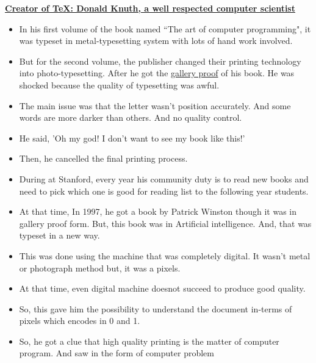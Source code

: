 \documentclass{article}
\begin{document}
\noindent \underline{\bfseries Creator of \TeX: Donald Knuth, a well respected computer scientist}

\begin{itemize}


\item In his first volume of the book named \textquotedblleft The art of computer programming", it was typeset in 
metal-typesetting system with lots of hand work involved. 


\item But for the second volume, the publisher changed their printing technology into photo-typesetting. After he
got the \href{https://en.wikipedia.org/wiki/Galley_proof}{gallery proof} of his book. He was shocked because the quality of typesetting was awful.


\item The main issue was that the letter wasn't position accurately. And some words are more darker than others. And no quality control.


\item He said, 'Oh my god! I don't want to see my book like this!'


\item Then, he cancelled the final printing process.


\item During at Stanford, every year his community duty is to read new books and need to pick
which one is good for reading list to the following year students.


\item At that time, In 1997, he got a book by Patrick Winston though it was in gallery proof form. But, this book was in Artificial intelligence. And, that was typeset in a new way. 

\item This was done using the machine that was completely digital. It wasn't metal or photograph method but, it was a pixels.


\item At that time, even digital machine doesnot succeed to produce good quality.


\item So, this gave him the possibility to understand the document in-terms of pixels which encodes in 0 and 1. 


\item So, he got a clue that high quality printing is the matter of computer program. And saw in the form of computer problem


\end{itemize}
\end{document}
